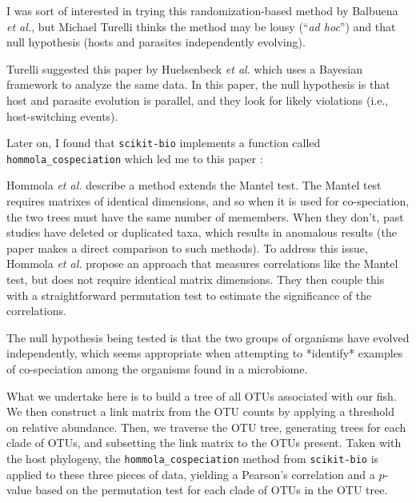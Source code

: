 I was sort of interested in trying this randomization-based method by Balbuena 
{\em et al.}, but Michael Turelli thinks the method may be lousy (``{\em ad hoc}'') and 
that null hypothesis (hosts and parasites independently evolving).


Turelli suggested this paper by Huelsenbeck {\em et al.} which uses a Bayesian
framework to analyze the same data. In this paper, the null hypothesis is that
host and parasite evolution is parallel, and they look for likely violations
(i.e., host-switching events).


Later on, I found that {\tt scikit-bio} implements a function called {\tt hommola\_cospeciation} %
which led me to this paper :


Hommola {\em et al.} describe a method extends the Mantel test. \cite{mantel1967detection} The Mantel test
requires matrixes of identical dimensions, and so when it is used for 
co-speciation, the two trees must have the same number of memembers. When
they don't, past studies have deleted or duplicated taxa, which results in
anomalous results (the paper makes a direct comparison to such methods).
To address this issue, Hommola {\em et al.} \cite{hommola2009permutation} propose an approach that measures
correlations like the Mantel test, but does not require identical matrix
dimensions. They then couple this with a straightforward permutation test 
to estimate the significance of the correlations.

The null hypothesis being tested is that the two groups of organisms have
evolved independently, which seems appropriate when attempting to *identify*
examples of co-speciation among the organisms found in a microbiome. 

What we undertake here is to build a tree of all OTUs associated with our
fish. We then construct a link matrix from the OTU counts by applying a
threshold on relative abundance. Then, we traverse the OTU tree, generating
trees for each clade of OTUs, and subsetting the link matrix to the OTUs
present. Taken with the host phylogeny, the {\tt hommola\_cospeciation} method 
from {\tt scikit-bio} is applied to these three pieces of data, yielding a 
Pearson's correlation and a $p$-value based on the permutation test for 
each clade of OTUs in the OTU tree.

